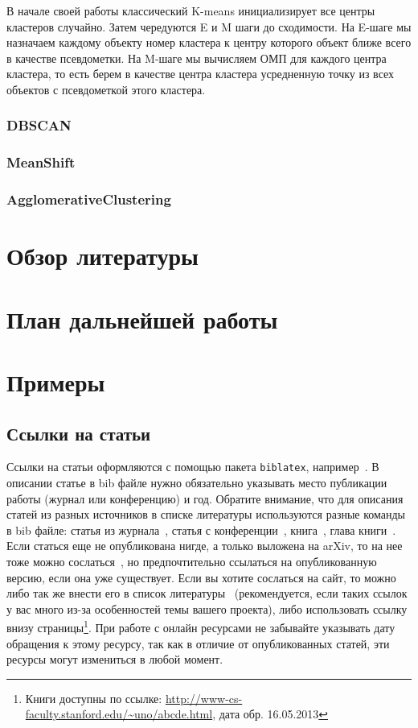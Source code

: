 \documentclass[a4paper,12pt]{extarticle}
\begin{document}
В начале своей работы классический K-means инициализирует все 
центры кластеров случайно. Затем чередуются E и M шаги до 
сходимости. На E-шаге мы назначаем каждому объекту номер
кластера к центру которого объект ближе всего в качестве псевдометки.
На M-шаге мы вычисляем ОМП для каждого центра кластера, то есть 
берем в качестве центра кластера усредненную точку из всех объектов 
с псевдометкой этого кластера.

\subsubsection{DBSCAN}

\subsubsection{MeanShift}

\subsubsection{AgglomerativeClustering}

\section{Обзор литературы}
\section{План дальнейшей работы}

\section{Примеры} 
\subsection{Ссылки на статьи}

Ссылки на статьи оформляются с помощью пакета \texttt{biblatex}, например~\cite{chirkova18}. В описании статье в bib файле нужно обязательно указывать место публикации работы (журнал или конференцию) и год. Обратите внимание, что для описания статей из разных источников в списке литературы используются разные команды в bib файле: статья из журнала~\cite{ctan}, статья с конференции~\cite{chirkova18}, книга~\cite{knuth-acp}, глава книги~\cite{knuth-fa}. Если статься еще не опубликована нигде, а только выложена на arXiv, то на нее тоже можно сослаться~\cite{chirkova18_arxiv}, но предпочтительно ссылаться на опубликованную версию, если она уже существует. Если вы хотите сослаться на сайт, то можно либо так же внести его в список литературы~\cite{knuthwebsite} (рекомендуется, если таких ссылок у вас много из-за особенностей темы вашего проекта), либо использовать ссылку внизу страницы\footnote{Книги доступны по ссылке: \url{http://www-cs-faculty.stanford.edu/~uno/abcde.html}, дата обр. 16.05.2013}. При работе с онлайн ресурсами не забывайте указывать дату обращения к этому ресурсу, так как в отличие от опубликованных статей, эти ресурсы могут измениться в любой момент.
\end{document}
